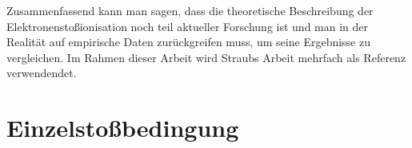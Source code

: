 Zusammenfassend kann man sagen, dass die theoretische Beschreibung der Elektronenstoßionisation noch teil aktueller Forschung ist und man in der Realität auf empirische Daten zurückgreifen muss, um seine Ergebnisse zu vergleichen. Im Rahmen dieser Arbeit wird Straubs Arbeit \cite{Straub} mehrfach als Referenz verwendendet. 

\section{Einzelstoßbedingung}